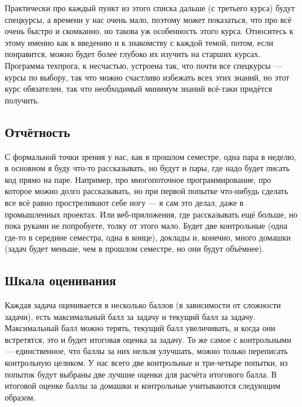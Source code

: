 \documentclass{../../text-style}
\begin{document}
Практически про каждый пункт из этого списка дальше (с третьего курса) будут спецкурсы, а времени у нас очень мало, поэтому может показаться, что про всё очень быстро и скомканно, но такова уж особенность этого курса. Относитесь к этому именно как к введению и к знакомству с каждой темой, потом, если понравится, можно будет более глубоко их изучить на старших курсах. Программа техпрога, к несчастью, устроена так, что почти все спецкурсы --- курсы по выбору, так что можно счастливо избежать всех этих знаний, но этот курс обязателен, так что необходимый минимум знаний всё-таки придётся получить.

\subsection{Отчётность}

С формальной точки зрения у нас, как в прошлом семестре, одна пара в неделю, в основном я буду что-то рассказывать, но будут и пары, где надо будет писать код прямо на паре. Например, про многопоточное программирование, про которое можно долго рассказывать, но при первой попытке что-нибудь сделать все всё равно простреливают себе ногу --- я сам это делал, даже в промышленных проектах. Или веб-приложения, где рассказывать ещё больше, но пока руками не попробуете, толку от этого мало. Будет две контрольные (одна где-то в середине семестра, одна в конце), доклады и, конечно, много домашки (задач будет меньше, чем в прошлом семестре, но они будут объёмнее).

\subsection{Шкала оценивания}

Каждая задача оценивается в несколько баллов (в зависимости от сложности задачи), есть максимальный балл за задачу и текущий балл за задачу. Максимальный балл можно терять, текущий балл увеличивать, и когда они встретятся, это и будет итоговая оценка за задачу. То же самое с контрольными --- единственное, что баллы за них нельзя улучшать, можно только переписать контрольную целиком. У нас всего две контрольные и три-четыре попытки, из попыток будут выбраны две лучшие оценки для расчёта итогового балла. В итоговой оценке баллы за домашки и контрольные учитываются следующим образом.
\end{document}
